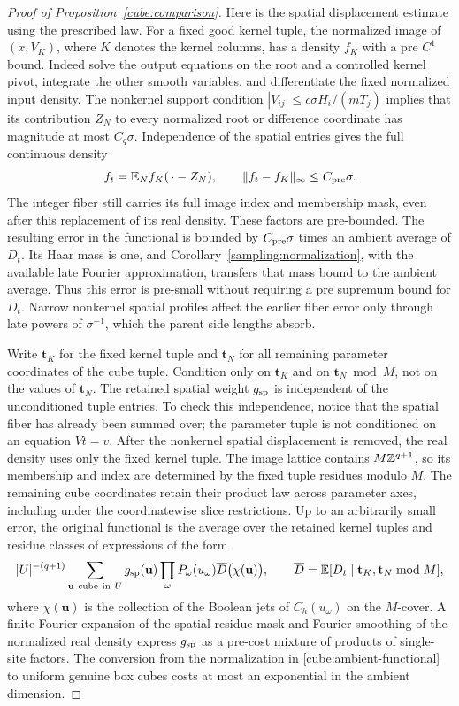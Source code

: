 \begin{proof}[Proof of Proposition~\ref{cube:comparison}]
Here is the spatial displacement estimate using the prescribed law.
For a fixed good kernel tuple, the normalized image of $(x,V_K)$,
where $K$ denotes the kernel columns, has a density $f_K$ with a pre
$C^1$ bound.  Indeed solve the output equations on the root and a
controlled kernel pivot, integrate the other smooth variables, and
differentiate the fixed normalized input density.  The nonkernel
support condition $|V_{ij}|\le c\sigma H_i/(mT_j)$ implies that its
contribution $Z_N$ to every normalized root or difference coordinate
has magnitude at most $C_q\sigma$.  Independence of the spatial
entries gives the full continuous density
\[
 f_t=\mathbb E_N f_K(\,\cdot-Z_N),\qquad
                 \|f_t-f_K\|_\infty\le C_{\rm pre}\sigma.
\]
The integer fiber still carries its full image index and membership
mask, even after this replacement of its real density.  These factors
are pre-bounded.  The resulting error in the functional is bounded by
$C_{\rm pre}\sigma$ times an ambient average of $D_t$.  Its Haar
mass is one, and Corollary~\ref{sampling:normalization}, with the
available late Fourier approximation, transfers that mass bound to
the ambient average.  Thus this error is pre-small without requiring
a pre supremum bound for $D_t$.  Narrow nonkernel spatial profiles
affect the earlier fiber error only through late powers of
$\sigma^{-1}$, which the parent side lengths absorb.

Write $\mathbf t_K$ for the fixed kernel tuple and $\mathbf t_N$
for all remaining parameter coordinates of the cube tuple. Condition
only on $\mathbf t_K$ and on $\mathbf t_N\bmod M$, not on the
values of $\mathbf t_N$.  The retained spatial weight $g_{\rm sp}$ is independent
of the unconditioned tuple entries.  To check this independence,
notice that the spatial fiber has already been summed over; the
parameter tuple is not conditioned on an equation $Vt=v$.
After the nonkernel spatial displacement is removed, the real
density uses only the fixed kernel tuple.  The image lattice
contains $M\mathbb Z^{q+1}$, so its membership and index are determined
by the fixed tuple residues modulo $M$.  The remaining cube
coordinates retain their product law across parameter axes,
including under the coordinatewise slice restrictions.
Up to an arbitrarily small error, the original functional is
the average over the retained kernel tuples and residue classes of
expressions of the form
\begin{equation}
 |U|^{-(q+1)}\sum_{\mathbf u\ {\rm cube\ in}\ U}
 g_{\rm sp}(\mathbf u)\prod_\omega P_\omega(u_\omega)
       \overline D\bigl(\chi(\mathbf u)\bigr),
 \qquad
 \overline D=\E[D_t\mid\mathbf t_K,\mathbf t_N\bmod M],
 \label{cube:ambient-functional}
\end{equation}
where $\chi(\mathbf u)$ is the collection of the Boolean jets of
$C_h(u_\omega)$ on the $M$-cover.  A finite Fourier expansion of the
spatial residue mask and Fourier smoothing of the normalized real
density express $g_{\rm sp}$ as a pre-cost mixture of products of
single-site factors.  The conversion from the normalization in
\eqref{cube:ambient-functional} to uniform genuine box cubes costs
at most an exponential in the ambient dimension.


\end{proof}
